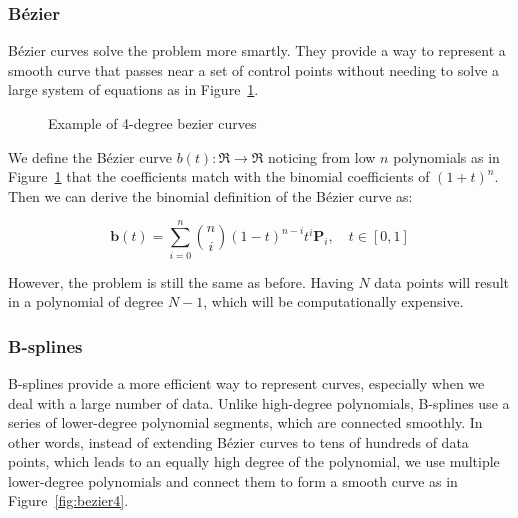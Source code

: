 \subsubsection{Bézier}
Bézier curves solve the problem more smartly. They provide a way to represent a smooth curve that passes near a set of control points without needing to solve a large system of equations as in Figure~\ref{fig:bezier2}.   
\begin{figure}[H]
    \centering
    \hfill
    \caption{Example of 4-degree bezier curves}
    \label{fig:bezier2}
\end{figure}


We define the Bézier curve $b(t): \Re \to \Re$ noticing from low $n$ polynomials as in Figure~\ref{fig:bezier2} that the coefficients match with the binomial coefficients of $(1+t)^n$. Then we can derive the binomial definition of the Bézier curve as:

\[
\mathbf{b}(t) = \sum_{i=0}^n \binom{n}{i} (1-t)^{n-i} t^i \mathbf{P}_i, \quad t \in [0, 1]
\]

However, the problem is still the same as before. Having $N$ data points will result in a polynomial of degree $N-1$, which will be computationally expensive.

\subsubsection{B-splines}
B-splines provide a more efficient way to represent curves, especially when we deal with a large number of data. Unlike high-degree polynomials, B-splines use a series of lower-degree polynomial segments, which are connected smoothly.
In other words, instead of extending Bézier curves to tens of hundreds of data points, which leads to an equally high degree of the polynomial, we use multiple lower-degree polynomials and connect them to form a smooth curve as in Figure~\ref{fig:bezier4}.


